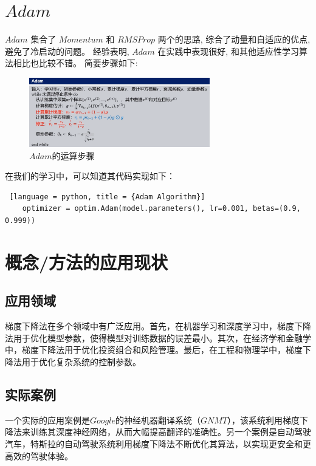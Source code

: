 \documentclass[printMode=true, declarePage=false]{ecnuthesis}
\begin{document}
    \section{$Adam$}

    $Adam$ 集合了 $Momentum$ 和 $RMSProp$ 两个的思路, 综合了动量和自适应的优点, 避免了冷启动的问题。
    经验表明, $Adam$ 在实践中表现很好, 和其他适应性学习算法相比也比较不错。
    简要步骤如下:

    \begin{figure} [H]
        \centering
        \includegraphics[width=0.7\textwidth]{../lectures/img/adam-steps}
        \caption{$Adam$的运算步骤}
    \end{figure}

    在我们的学习中，可以知道其代码实现如下：

    \begin{lstlisting} [language = python, title = {Adam Algorithm}]
    optimizer = optim.Adam(model.parameters(), lr=0.001, betas=(0.9, 0.999))
    \end{lstlisting}

    \section{概念/方法的应用现状}

    \subsection{应用领域}
    梯度下降法在多个领域中有广泛应用。首先，在机器学习和深度学习中，梯度下降法用于优化模型参数，使得模型对训练数据的误差最小。其次，在经济学和金融学中，梯度下降法用于优化投资组合和风险管理。最后，在工程和物理学中，梯度下降法用于优化复杂系统的控制参数。

    \subsection{实际案例}
    一个实际的应用案例是$Google$的神经机器翻译系统（$GNMT$），该系统利用梯度下降法来训练其深度神经网络，从而大幅提高翻译的准确性。另一个案例是自动驾驶汽车，特斯拉的自动驾驶系统利用梯度下降法不断优化其算法，以实现更安全和更高效的驾驶体验。
\end{document}
